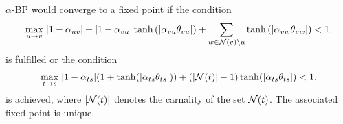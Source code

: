 \begin{corollary}
  $\alpha$-BP would converge to a fixed point if the condition
  \begin{align}
    \underset{u \rightarrow v}{\max}\;  | 1-\alpha_{uv} | + | 1-\alpha_{vu} |\tanh{(| \alpha_{vu} \theta_{vu} |)} + \sum_{w \in \mathcal{N}(v) \backslash u} \tanh{(| \alpha_{{vw}} \theta_{vw} |)} < 1,
  \end{align}
  is fulfilled or the condition
  \begin{align}
    \underset{t \rightarrow s}{\max}\; | 1-\alpha_{ts} | (1 + \tanh(| \alpha_{ts} \theta_{ts} |)) + (| \mathcal{N}(t) |-1)\tanh(| \alpha_{ts} \theta_{ts} |) < 1.
  \end{align}
  is achieved, where $| \mathcal{N}(t) |$ denotes the carnality of the set $\mathcal{N}(t)$. The associated fixed point is unique.
\end{corollary}

